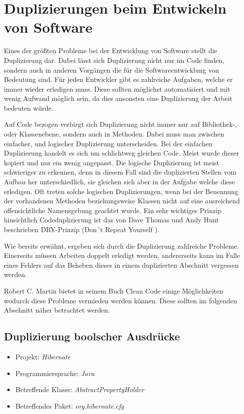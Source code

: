 \section{Duplizierungen beim Entwickeln von Software}
\SuperPar Eines der größten Probleme bei der Entwicklung von Software stellt die Duplizierung dar. Dabei lässt sich Duplizierung nicht nur im Code finden, sondern auch in anderen Vorgängen die für die Softwareentwicklung von Bedeutung sind. Für jeden Entwickler gibt es zahlreiche Aufgaben, welche er immer wieder erledigen muss. Diese sollten möglichst automatisiert und mit wenig Aufwand möglich sein, da dies ansonsten eine Duplizierung der Arbeit bedeuten würde.

\SuperPar Auf Code bezogen verbirgt sich Duplizierung nicht immer nur auf Bibliothek-, oder Klassenebene, sondern auch in Methoden. Dabei muss man zwischen einfacher, und logischer Duplizierung unterscheiden. Bei der einfachen Duplizierung handelt es sich um schlichtweg gleichen Code. Meist wurde dieser kopiert und nur ein wenig angepasst. Die logische Duplizierung ist meist schwieriger zu erkennen, denn in diesem Fall sind die duplizierten Stellen vom Aufbau her unterschiedlich, sie gleichen sich aber in der Aufgabe welche diese erledigen. Oft treten solche logischen Duplizierungen, wenn bei der Benennung der vorhandenen Methoden beziehungsweise Klassen nicht auf eine ausreichend offensichtliche Namensgebung geachtet wurde. Ein sehr wichtiges Prinzip hinsichtlich Codeduplizierung ist das von Dave Thomas und Andy Hunt beschrieben DRY-Prinzip (Don´t Repeat Yourself \cite{PRAG1999}).

\SuperPar Wie bereits erwähnt, ergeben sich durch die Duplizierung zahlreiche Probleme. Einerseits müssen Arbeiten doppelt erledigt werden, andererseits kann im Falle eines Fehlers auf das Beheben dieses in einem duplizierten Abschnitt vergessen werden.

\SuperPar Robert C. Martin bietet in seinem Buch Clean Code einige Möglichkeiten wodurch diese Probleme vermieden werden können. Diese sollten im folgenden Abschnitt näher betrachtet werden.

\subsection{Duplizierung boolscher Ausdrücke}
\label{cha:BadBoolStatements}
\begin{itemize}
	\item Projekt: \textit{Hibernate}
	\item Programmiersprache: \textit{Java}
	\item Betreffende Klasse: \textit{AbstractPropertyHolder}
	\item Betreffendes Paket: \textit{org.hibernate.cfg}
\end{itemize}

